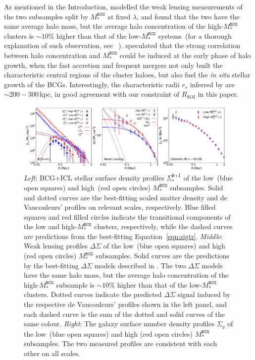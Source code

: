 \documentclass[fleqn,usenatbib]{mnras}
\newcommand{\rsoi}{R_{\mathrm{SOI}}}
\newcommand{\sigbi}{\Sigma_*^{\texttt{B+I}}}
\newcommand{\sigg}{\Sigma_g}
\newcommand{\msbcg}{M_*^{\texttt{BCG}}}
\newcommand{\kpc}{\mathrm{kpc}}
\newcommand{\ds}{\Delta\Sigma}
\begin{document}
As mentioned in the Introduction,  modelled the weak
lensing measurements of the two subsamples split by $\msbcg$ at fixed
$\lambda$, and found that the two have the same average halo mass, but the
average halo concentration of the high-$\msbcg$ clusters is
${\sim}10\%$ higher than that of the low-$\msbcg$ systems~(for a thorough
explanation of such observation, see ~\citet{Zu2021b}).
 speculated that the strong correlation between halo
concentration and $\msbcg$ could be induced at the early phase of halo
growth, when the fast accretion and frequent mergers not only built the
characteristic central regions of the cluster haloes, but also fuel the {\it in situ}
stellar growth of the BCGs. Interestingly, the characteristic radii $r_s$
inferred by  are ${\sim}200{-}300\,\kpc$, in good
agreement with our constraint of $\rsoi$ in this paper.


\begin{figure}
    \centering\includegraphics[width=0.96\textwidth]{fig/subsamples_SB_SM.pdf}
    \caption{{\it Left}: BCG+ICL stellar surface density profiles $\sigbi$
    of the low~(blue open squares) and high~(red open circles) $\msbcg$
    subsamples. Solid and dotted curves are the best-fitting scaled matter
    density and de Vaucouleurs' profiles on relevant scales, respectively.
    Blue filled squares and red filled circles indicate the transitional
    components of the low and high-$\msbcg$ clusters, respectively, while
    the dashed curves are predictions from the best-fitting
    Equation~\ref{eqn:sigtr}.  {\it Middle}: Weak lensing profiles $\ds$ of
    the low~(blue open squares) and high (red open circles) $\msbcg$
    subsamples. Solid curves are the predictions by the best-fitting $\ds$
    models described in . The two $\ds$ models have the
    same halo mass, but the average halo concentration of the high-$\msbcg$
    subsample is ${\sim}10\%$ higher than that of the low-$\msbcg$ clusters. Dotted
    curves indicate the predicted $\ds$ signal induced by the respective de
    Vaucouleurs' profiles shown in the left panel, and each dashed curve is
    the sum of the dotted and solid curves of the same colour.  {\it
    Right}: The galaxy surface number density profiles $\sigg$ of the
    low~(blue open squares) and high (red open circles) $\msbcg$
    subsamples. The two measured profiles are consistent with each other on
    all scales.  \label{fig:subdecomposition}}
\end{figure}
\end{document}
